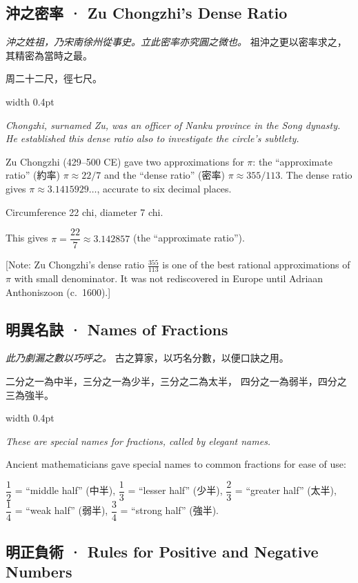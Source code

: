 \documentclass[10pt,a4paper]{article}
\newlength{\cnwidth}
\newlength{\enwidth}
\newcommand{\bilingual}[2]{%
  \noindent%
  \begin{minipage}[t]{\cnwidth}%
    #1%
  \end{minipage}%
  \hfill\vrule width 0.4pt\hfill%
  \begin{minipage}[t]{\enwidth}%
    #2%
  \end{minipage}%
  \par\smallskip%
}
\newcommand{\bilingualsubsection}[2]{%
  \subsection*{#1 · #2}
}
\newcommand{\transnote}[1]{%
  \par\smallskip\noindent\textcolor{notecolor}{\small[Note: #1]}\par\smallskip
}
\begin{document}
\bilingualsubsection{沖之密率}{Zu Chongzhi's Dense Ratio}

\bilingual{%
  \textit{沖之姓祖，乃宋南徐州從事史。立此密率亦究圓之微也。}
  祖沖之更以密率求之，其精密為當時之最。

  周二十二尺，徑七尺。
}{%
  \textit{Chongzhi, surnamed Zu, was an officer of Nanku province in the Song dynasty.
  He established this dense ratio also to investigate the circle's subtlety.}

  Zu Chongzhi (429--500 CE) gave two approximations for $\pi$:
  the ``approximate ratio'' (約率) $\pi \approx 22/7$ and
  the ``dense ratio'' (密率) $\pi \approx 355/113$.
  The dense ratio gives $\pi \approx 3.1415929\ldots$, accurate to six decimal places.

  Circumference 22 chi, diameter 7 chi.

  This gives $\pi = \dfrac{22}{7} \approx 3.142857$ (the ``approximate ratio'').
}

\transnote{Zu Chongzhi's dense ratio $\frac{355}{113}$ is one of the best rational
approximations of $\pi$ with small denominator. It was not rediscovered in Europe
until Adriaan Anthoniszoon (c.\ 1600).}

\bilingualsubsection{明異名訣}{Names of Fractions}

\bilingual{%
  \textit{此乃劇漏之數以巧呼之。}
  古之算家，以巧名分數，以便口訣之用。

  二分之一為中半，三分之一為少半，三分之二為太半，
  四分之一為弱半，四分之三為強半。
}{%
  \textit{These are special names for fractions, called by elegant names.}

  Ancient mathematicians gave special names to common fractions for ease of use:

  $\dfrac{1}{2}$ = ``middle half'' (中半),\quad
  $\dfrac{1}{3}$ = ``lesser half'' (少半),\quad
  $\dfrac{2}{3}$ = ``greater half'' (太半),\\
  $\dfrac{1}{4}$ = ``weak half'' (弱半),\quad
  $\dfrac{3}{4}$ = ``strong half'' (強半).
}

\bilingualsubsection{明正負術}{Rules for Positive and Negative Numbers}
\end{document}
